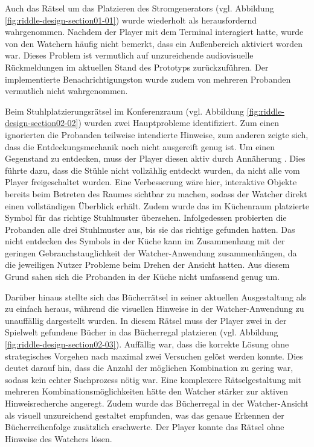 Auch das Rätsel um das Platzieren des Stromgenerators  (vgl. Abbildung \ref{fig:riddle-design-section01-01}) wurde wiederholt als herausfordernd wahrgenommen. Nachdem der Player mit dem Terminal interagiert hatte, wurde von den Watchern häufig nicht bemerkt, dass ein Außenbereich aktiviert worden war. Dieses Problem ist vermutlich auf unzureichende audiovisuelle Rückmeldungen im aktuellen Stand des Prototyps zurückzuführen. Der implementierte Benachrichtigungston wurde zudem von mehreren Probanden vermutlich nicht wahrgenommen.

Beim Stuhlplatzierungsrätsel im Konferenzraum (vgl. Abbildung \ref{fig:riddle-design-section02-02}) wurden zwei Hauptprobleme identifiziert. Zum einen ignorierten die Probanden teilweise intendierte Hinweise, zum anderen zeigte sich, dass die Entdeckungsmechanik noch nicht ausgereift genug ist. Um einen Gegenstand zu entdecken, muss der Player diesen aktiv durch Annäherung . Dies führte dazu, dass die Stühle nicht vollzählig entdeckt wurden, da nicht alle vom Player freigeschaltet wurden. Eine Verbesserung wäre hier, interaktive Objekte bereits beim Betreten des Raumes sichtbar zu machen, sodass der Watcher direkt einen vollständigen Überblick erhält. Zudem wurde das im Küchenraum platzierte Symbol für das richtige Stuhlmuster übersehen. Infolgedessen probierten die Probanden alle drei Stuhlmuster aus, bis sie das richtige gefunden hatten. Das nicht entdecken des Symbols in der Küche kann im Zusammenhang mit der geringen Gebrauchstauglichkeit der Watcher-Anwendung zusammenhängen, da die jeweiligen Nutzer Probleme beim Drehen der Ansicht hatten. Aus diesem Grund sahen sich die Probanden in der Küche nicht umfassend genug um.

Darüber hinaus stellte sich das Bücherrätsel in seiner aktuellen Ausgestaltung als zu einfach heraus, während die visuellen Hinweise in der Watcher-Anwendung zu unauffällig dargestellt wurden. In diesem Rätsel muss der Player zwei in der Spielwelt gefundene Bücher in das Bücherregal platzieren   (vgl. Abbildung \ref{fig:riddle-design-section02-03}). Auffällig war, dass die korrekte Lösung ohne strategisches Vorgehen nach maximal zwei Versuchen gelöst werden konnte. Dies deutet darauf hin, dass die Anzahl der möglichen Kombination zu gering war, sodass kein echter Suchprozess nötig war. Eine komplexere Rätselgestaltung mit mehreren Kombinationsmöglichkeiten hätte den Watcher stärker zur aktiven Hinweisrecherche angeregt. Zudem wurde das Bücherregal in der Watcher-Ansicht als visuell unzureichend gestaltet empfunden, was das genaue Erkennen der Bücherreihenfolge zusätzlich erschwerte. Der Player konnte das Rätsel ohne Hinweise des Watchers lösen.

